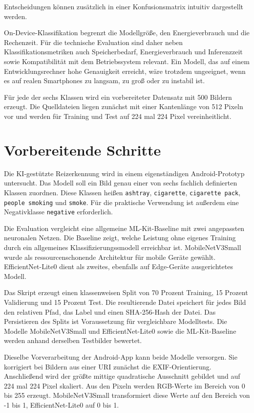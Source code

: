Entscheidungen können zusätzlich in einer Konfusionsmatrix intuitiv dargestellt werden. 

On-Device-Klassifikation begrenzt die Modellgröße, den Energieverbrauch und die Rechenzeit. Für die technische Evaluation sind daher neben Klassifikationsmetriken auch Speicherbedarf, Energieverbrauch und Inferenzzeit sowie Kompatibilität mit dem Betriebssystem relevant. Ein Modell, das auf einem Entwicklungsrechner hohe Genauigkeit erreicht, wäre trotzdem ungeeignet, wenn es auf realen Smartphones zu langsam, zu groß oder zu instabil ist.

Für jede der sechs Klassen wird ein vorbereiteter Datensatz mit 500 Bildern erzeugt. Die Quelldateien liegen zunächst mit einer Kantenlänge von 512 Pixeln vor und werden für Training und Test auf 224 mal 224 Pixel vereinheitlicht.

\section{Vorbereitende Schritte}
Die KI-gestützte Reizerkennung wird in einem eigenständigen Android-Prototyp untersucht. Das Modell soll ein Bild genau einer von sechs fachlich definierten Klassen zuordnen. Diese Klassen heißen \texttt{ashtray}, \texttt{cigarette}, \texttt{cigarette pack}, \texttt{people smoking} und \texttt{smoke}. Für die praktische Verwendung ist außerdem eine Negativklasse \texttt{negative} erforderlich.

Die Evaluation vergleicht eine allgemeine ML-Kit-Baseline mit zwei angepassten neuronalen Netzen. Die Baseline zeigt, welche Leistung ohne eigenes Training durch ein allgemeines Klassifizierungssmodell erreichbar ist. MobileNetV3Small wurde als ressourcenschonende Architektur für mobile Geräte gewählt. EfficientNet-Lite0 dient als zweites, ebenfalls auf Edge-Geräte ausgerichtetes Modell.

Das Skript  erzeugt einen klassenweisen Split von 70 Prozent Training, 15 Prozent Validierung und 15 Prozent Test. Die resultierende Datei  speichert für jedes Bild den relativen Pfad, das Label und einen SHA-256-Hash der Datei. Das Persistieren des Splits ist Voraussetzung für vergleichbare Modelltests. Die Modelle Mobile\-NetV3\-Small und EfficientNet-Lite0 sowie die ML-Kit-Baseline werden anhand derselben Testbilder bewertet.

Dieselbe Vorverarbeitung der Android-App kann beide Modelle versorgen. Sie korrigiert bei Bildern aus einer URI zunächst die EXIF-Orientierung. Anschließend wird der größte mittige quadratische Ausschnitt gebildet und auf 224 mal 224 Pixel skaliert. Aus den Pixeln werden RGB-Werte im Bereich von 0 bis 255 erzeugt. MobileNetV3Small transformiert diese Werte auf den Bereich von -1 bis 1, EfficientNet-Lite0 auf 0 bis 1.

